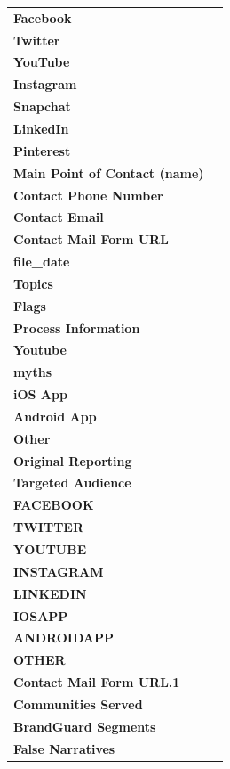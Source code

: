 \begin{table}[H]
\begin{tabularx}{\textwidth}{ | X | c | }
\textbf{Facebook} & \\
\textbf{Twitter} & \\
\textbf{YouTube} & \\
\textbf{Instagram} & \\
\textbf{Snapchat} & \\
\textbf{LinkedIn} & \\
\textbf{Pinterest} & \\
\textbf{Main Point of Contact (name)} & \\
\textbf{Contact Phone Number} & \\
\textbf{Contact Email} & \\
\textbf{Contact Mail Form URL} & \\
\textbf{file_date} & \\
\textbf{Topics} & \\
\textbf{Flags} & \\
\textbf{Process Information} & \\
\textbf{Youtube} & \\
\textbf{myths} & \\
\textbf{iOS App} & \\
\textbf{Android App} & \\
\textbf{Other} & \\
\textbf{Original Reporting} & \\
\textbf{Targeted Audience} & \\
\textbf{FACEBOOK} & \\
\textbf{TWITTER} & \\
\textbf{YOUTUBE} & \\
\textbf{INSTAGRAM} & \\
\textbf{LINKEDIN} & \\
\textbf{IOSAPP} & \\
\textbf{ANDROIDAPP} & \\
\textbf{OTHER} & \\
\textbf{Contact Mail Form URL.1} & \\
\textbf{Communities Served} & \\
\textbf{BrandGuard Segments} & \\
\textbf{False Narratives} & \\
\bottomrule
\end{tabularx}
\end{table}